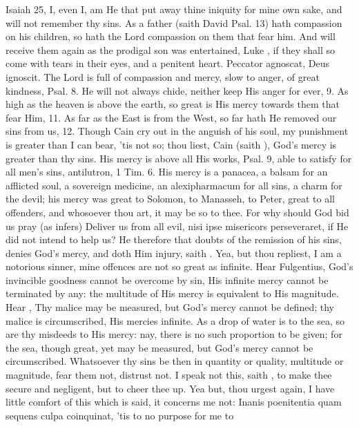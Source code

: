 {Isaiah  25, I, even I, am He that put away thine iniquity for
mine own sake, and will not remember thy sins. As a father (saith David
Psal.  13) hath compassion on his children, so hath the Lord
compassion on them that fear him. And will receive them again as the
prodigal son was entertained, Luke , if they shall so come with
tears in their eyes, and a penitent heart. Peccator agnoscat, Deus
ignoscit. The Lord is full of compassion and mercy, slow to anger, of
great kindness, Psal.  8. He will not always chide, neither keep
His anger for ever, 9. As high as the heaven is above the earth, so
great is His mercy towards them that fear Him, 11. As far as the East
is from the West, so far hath He removed our sins from us, 12. Though
Cain cry out in the anguish of his soul, my punishment is greater than
I can bear, 'tis not so; thou liest, Cain (saith \Austin{}), God's mercy
is greater than thy sins. His mercy is above all His works, Psal. 
9, able to satisfy for all men's sins, antilutron, 1 Tim.  6. His
mercy is a panacea, a balsam for an afflicted soul, a sovereign
medicine, an alexipharmacum for all sins, a charm for the devil; his
mercy was great to Solomon, to Manasseh, to Peter, great to all
offenders, and whosoever thou art, it may be so to thee. For why should
God bid us pray (as \Austin{} infers) Deliver us from all evil, nisi ipse
misericors perseveraret, if He did not intend to help us? He therefore
that doubts of the remission of his sins, denies God's mercy, and
doth Him injury, saith \Austin{}. Yea, but thou repliest, I am a notorious
sinner, mine offences are not so great as infinite. Hear Fulgentius,
God's invincible goodness cannot be overcome by sin, His infinite
mercy cannot be terminated by any: the multitude of His mercy is
equivalent to His magnitude. Hear \Chrysostom{}, Thy malice may be
measured, but God's mercy cannot be defined; thy malice is
circumscribed, His mercies infinite. As a drop of water is to the sea,
so are thy misdeeds to His mercy: nay, there is no such proportion to
be given; for the sea, though great, yet may be measured, but God's
mercy cannot be circumscribed. Whatsoever thy sins be then in quantity
or quality, multitude or magnitude, fear them not, distrust not. I
speak not this, saith \Chrysostom{}, to make thee secure and
negligent, but to cheer thee up. Yea but, thou urgest again, I have
little comfort of this which is said, it concerns me not: Inanis
poenitentia quam sequens culpa coinquinat, 'tis to no purpose for me to
}
